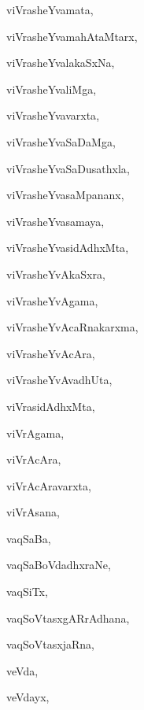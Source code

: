\begin{multicols}{3}
{\noindent
{viVrasheYvamata}, \pageref{viVrasheYvamata}

\noindent
{viVrasheYvamahAtaMtarx}, \pageref{viVrasheYvamahAtaMtarx}

\noindent
{viVrasheYvalakaSxNa}, \pageref{viVrasheYvalakaSxNa}

\noindent
{viVrasheYvaliMga}, \pageref{viVrasheYvaliMga}

\noindent
{viVrasheYvavarxta}, \pageref{viVrasheYvavarxta}

\noindent
{viVrasheYvaSaDaMga}, \pageref{viVrasheYvaSaDaMga}

\noindent
{viVrasheYvaSaDusathxla}, \pageref{viVrasheYvaSaDusathxla}

\noindent
{viVrasheYvasaMpananx}, \pageref{viVrasheYvasaMpananx}

\noindent
{viVrasheYvasamaya}, \pageref{viVrasheYvasamaya}

\noindent
{viVrasheYvasidAdhxMta}, \pageref{viVrasheYvasidAdhxMta}

\noindent
{viVrasheYvAkaSxra}, \pageref{viVrasheYvAkaSxra}

\noindent
{viVrasheYvAgama}, \pageref{viVrasheYvAgama}

\noindent
{viVrasheYvAcaRnakarxma}, \pageref{viVrasheYvAcaRnakarxma}

\noindent
{viVrasheYvAcAra}, \pageref{viVrasheYvAcAra}

\noindent
{viVrasheYvAvadhUta}, \pageref{viVrasheYvAvadhUta}

\noindent
{viVrasidAdhxMta}, \pageref{viVrasidAdhxMta}

\noindent
{viVrAgama}, \pageref{viVrAgama}

\noindent
{viVrAcAra}, \pageref{viVrAcAra}

\noindent
{viVrAcAravarxta}, \pageref{viVrAcAravarxta}

\noindent
{viVrAsana}, \pageref{viVrAsana}

\noindent
{vaqSaBa}, \pageref{vaqSaBa}

\noindent
{vaqSaBoVdadhxraNe}, \pageref{vaqSaBoVdadhxraNe}

\noindent
{vaqSiTx}, \pageref{vaqSiTx}

\noindent
{vaqSoVtasxgARrAdhana}, \pageref{vaqSoVtasxgARrAdhana}

\noindent
{vaqSoVtasxjaRna}, \pageref{vaqSoVtasxjaRna}

\noindent
{veVda}, \pageref{veVda}

\noindent
{veVdayx}, \pageref{veVdayx}

}
\end{multicols}

